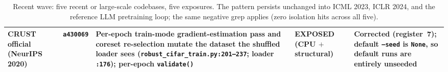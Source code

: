 \documentclass[10pt,letterpaper]{article}
\theoremstyle{remark}
\newcommand{\code}[1]{\texttt{#1}}
\begin{document}
\begin{table}[tbp]
\begin{tabular}{@{}L{2.5cm}L{1.15cm}L{5.95cm}L{1.9cm}L{3.5cm}@{}}
\addlinespace
CRUST official (NeurIPS 2020) & \code{a430069} &
Per-epoch train-mode gradient-estimation pass and coreset re-selection
mutate the dataset the shuffled loader sees
(\code{robust\_cifar\_train.py:201--237}; loader \code{:176}); per-epoch
\code{validate()} &
EXPOSED (CPU $+$ structural) &
Corrected (register~7); default \code{--seed} is \code{None}, so default
runs are entirely unseeded \\
\bottomrule
\end{tabular}
\caption{Recent wave: five recent or large-scale codebases, five
exposures. The pattern persists unchanged into ICML 2023, ICLR 2024, and
the reference LLM pretraining loop; the same negative grep applies
(zero isolation hits across all five).}
\label{tab:recent}
\end{table}
\end{document}
